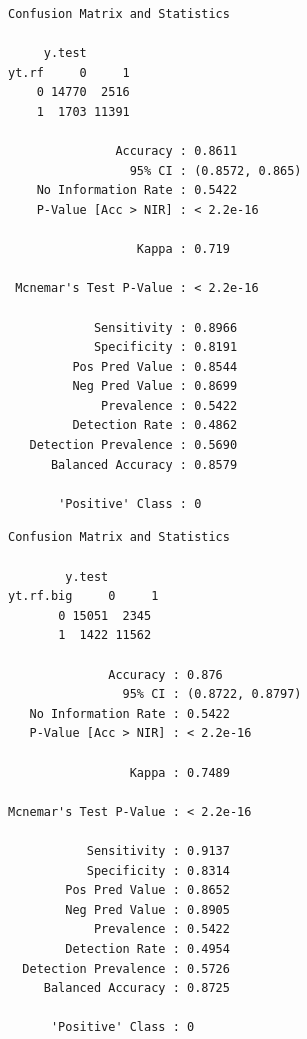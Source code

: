 \documentclass{article}
\begin{document}
\begin{verbatim}
Confusion Matrix and Statistics

     y.test
yt.rf     0     1
    0 14770  2516
    1  1703 11391
                                         
               Accuracy : 0.8611         
                 95% CI : (0.8572, 0.865)
    No Information Rate : 0.5422         
    P-Value [Acc > NIR] : < 2.2e-16      
                                         
                  Kappa : 0.719          
                                         
 Mcnemar's Test P-Value : < 2.2e-16      
                                         
            Sensitivity : 0.8966         
            Specificity : 0.8191         
         Pos Pred Value : 0.8544         
         Neg Pred Value : 0.8699         
             Prevalence : 0.5422         
         Detection Rate : 0.4862         
   Detection Prevalence : 0.5690         
      Balanced Accuracy : 0.8579         
                                         
       'Positive' Class : 0  

\end{verbatim}
\begin{verbatim}
Confusion Matrix and Statistics

        y.test
yt.rf.big     0     1
       0 15051  2345
       1  1422 11562
                                         
              Accuracy : 0.876           
                95% CI : (0.8722, 0.8797)
   No Information Rate : 0.5422          
   P-Value [Acc > NIR] : < 2.2e-16       
                                         
                 Kappa : 0.7489          
                                         
Mcnemar's Test P-Value : < 2.2e-16       
                                         
           Sensitivity : 0.9137          
           Specificity : 0.8314          
        Pos Pred Value : 0.8652          
        Neg Pred Value : 0.8905          
            Prevalence : 0.5422          
        Detection Rate : 0.4954          
  Detection Prevalence : 0.5726          
     Balanced Accuracy : 0.8725          
                                         
      'Positive' Class : 0               
                             
\end{verbatim}
\end{document}
